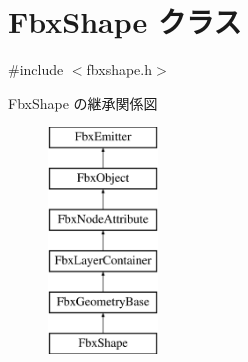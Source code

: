 \hypertarget{class_fbx_shape}{}\section{Fbx\+Shape クラス}
\label{class_fbx_shape}


{\ttfamily \#include $<$fbxshape.\+h$>$}

Fbx\+Shape の継承関係図\begin{figure}[H]
\begin{center}
\leavevmode
\includegraphics[height=6.000000cm]{class_fbx_shape}
\end{center}
\end{figure}
